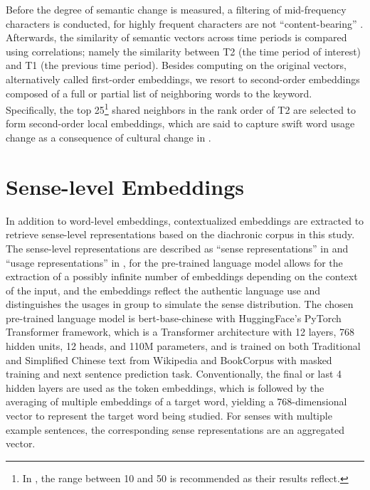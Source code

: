 Before the degree of semantic change is measured, a filtering of mid-frequency characters is conducted, for highly frequent characters are not ``content-bearing'' \parencite{hamilton2016cultural,rodda2017panta}. Afterwards, the similarity of semantic vectors across time periods is compared using correlations; namely the similarity between T2 (the time period of interest) and T1 (the previous time period). Besides computing on the original vectors, alternatively called first-order embeddings, we resort to second-order embeddings composed of a full or partial list of neighboring words to the keyword. Specifically, the top 25\footnote{In \textcite{hamilton2016cultural}, the range between 10 and 50 is recommended as their results reflect.} shared neighbors in the rank order of T2 are selected to form second-order local embeddings, which are said to capture swift word usage change as a consequence of cultural change in \textcite{hamilton2016cultural}.

\section{Sense-level Embeddings}
In addition to word-level embeddings, contextualized embeddings are extracted to retrieve sense-level representations based on the diachronic corpus in this study. The sense-level representations are described as ``sense representations'' in \textcite{hu2019diachronic} and ``usage representations'' in \textcite{giulianelli2019lexical}, for the pre-trained language model allows for the extraction of a possibly infinite number of embeddings depending on the context of the input, and the embeddings reflect the authentic language use and distinguishes the usages in group to simulate the sense distribution. The chosen pre-trained language model is bert-base-chinese \parencite{devlin2018bert} with HuggingFace's PyTorch Transformer framework, which is a Transformer architecture with 12 layers, 768 hidden units, 12 heads, and 110M parameters, and is trained on both Traditional and Simplified Chinese text from Wikipedia and BookCorpus with masked training and next sentence prediction task. Conventionally, the final or last 4 hidden layers are used as the token embeddings, which is followed by the averaging of multiple embeddings of a target word, yielding a 768-dimensional vector to represent the target word being studied. For senses with multiple example sentences, the corresponding sense representations are an aggregated vector.


